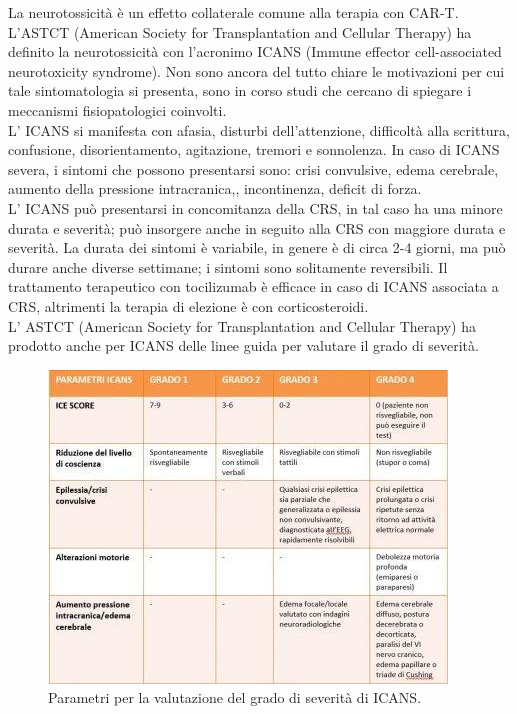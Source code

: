 La neurotossicità è un effetto collaterale comune alla terapia con CAR-T. 
L’ASTCT (American Society for Transplantation and Cellular Therapy) ha definito la neurotossicità con 
l’acronimo ICANS (Immune effector cell-associated neurotoxicity syndrome). Non sono ancora del tutto chiare le 
motivazioni per cui tale sintomatologia si presenta, sono in corso studi che cercano di spiegare i meccanismi 
fisiopatologici coinvolti.\\
L’ ICANS si manifesta con afasia, disturbi dell’attenzione, difficoltà alla scrittura, confusione, disorientamento, 
agitazione, tremori e sonnolenza. In caso di ICANS severa, i sintomi che possono presentarsi sono: crisi convulsive, 
edema cerebrale, aumento della pressione intracranica,, incontinenza, deficit di forza\cite{EMATOCART}.\\
L’ ICANS può presentarsi in concomitanza della CRS, in tal caso ha una minore durata e severità; può insorgere anche 
in seguito alla CRS con maggiore durata e severità. La durata dei sintomi è variabile, in genere è di circa 2-4 giorni,
ma può durare anche diverse settimane; i sintomi sono solitamente reversibili. 
Il trattamento terapeutico con tocilizumab è efficace in caso di ICANS associata a CRS, altrimenti la terapia di 
elezione è con corticosteroidi\cite{EMATOCART}.\\
L’ ASTCT (American Society for Transplantation and Cellular Therapy) 
ha prodotto anche per ICANS delle linee guida per valutare il grado di severità\cite{ASTCT}.\\

\begin{figure}[H]
    \begin{center}
    \includegraphics[width=0.7\columnwidth]{img/ICANS.jpeg}
    \end{center}
    \caption{Parametri per la valutazione del grado di severità di ICANS.
    \cite{EMATOCART}}

\end{figure}

